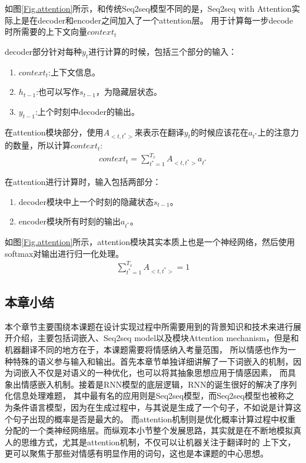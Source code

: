 \documentclass[supercite]{HustGraduPaper}
\theoremstyle{definition}
\begin{document}
如图\ref{Fig.attention}所示，和传统Seq2seq模型不同的是，Seq2seq with Attention实际上是在decoder和encoder之间加入了一个attention层。
用于计算每一步decode时所需要的上下文向量$context_t$

decoder部分针对每种$y_t$进行计算的时候，包括三个部分的输入：
\begin{enumerate}
  \item $context_t$:上下文信息。
  \item $h_{t-1}$:也可以写作$s_{t-1}$，为隐藏层状态。
  \item $y_{t-1}$:上个时刻中decoder的输出。
\end{enumerate}

在attention模块部分，使用$A_{<t,t^*>}$来表示在翻译$y_{t}$的时候应该花在$a_{t^*}$上的注意力的数量，所以计算$context_{t}$:
\begin{align}
  context_{t} = \sum_{t^*=1}^{T_x}{A_{<t,t^{*}>}}a_{t^*} \label{6}
\end{align}

在attention进行计算时，输入包括两部分：
\begin{enumerate}
  \item decoder模块中上一个时刻的隐藏状态$s_{t-1}$。
  \item encoder模块所有时刻的输出$a_{t^*}$。
\end{enumerate}

如图\ref{Fig.attention}所示，attention模块其实本质上也是一个神经网络，然后使用softmax对输出进行归一化处理。
\begin{align}
  \sum_{t^*=1}^{T_x}{A_{<t,t^{*}>}}=1 \label{7}
\end{align}

\subsection{本章小结}
本个章节主要围绕本课题在设计实现过程中所需要用到的背景知识和技术来进行展开介绍，主要包括词嵌入、Seq2seq model以及模块Attention mechanism，但是和机器翻译不同的地方在于，本课题需要将情感纳入考量范围，
所以情感也作为一种特殊的语义参与输入和输出。首先本章节单独详细讲解了一下词嵌入的机制，因为词嵌入不仅是对语义的一种优化，也可以将其抽象思想应用于情感因素，
而具象出情感嵌入机制。接着是RNN模型的底层逻辑，RNN的诞生很好的解决了序列化信息处理难题，
其中最有名的应用则是Seq2seq模型，而Seq2seq模型也被称之为条件语言模型，因为在生成过程中，与其说是生成了一个句子，不如说是计算这个句子出现的概率是否是最大的。
而attention机制则是优化概率计算过程中权重分配的一个类神经网络层。而纵观本小节整个发展思路，其实就是在不断地模拟真人的思维方式，尤其是attention机制，不仅可以让机器关注于翻译时的
上下文，更可以聚焦于那些对情感有明显作用的词句，这也是本课题的中心思想。
\end{document}
